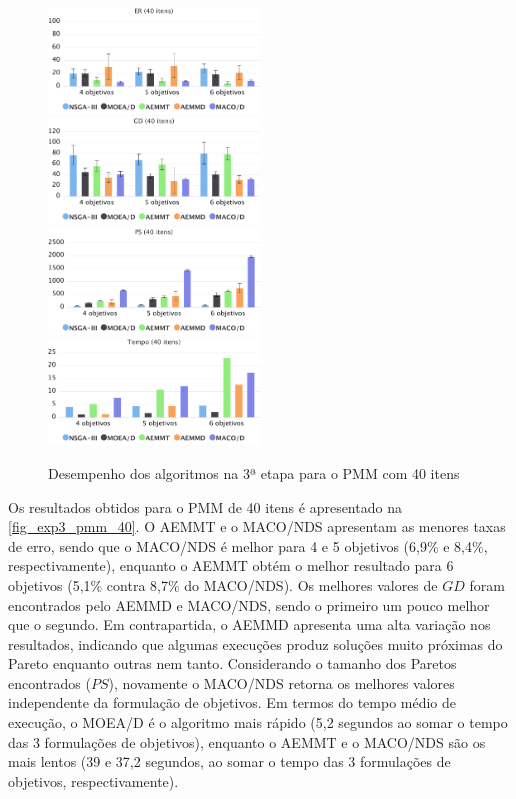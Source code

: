\begin{figure}[!htbp]	
	\includegraphics[width=0.5\textwidth]{cap_experimentos/figs/etapa3/er-mkp-40}
	\includegraphics[width=0.5\textwidth]{cap_experimentos/figs/etapa3/gd-mkp-40}
	\includegraphics[width=0.5\textwidth]{cap_experimentos/figs/etapa3/ps-mkp-40}
	\includegraphics[width=0.5\textwidth]{cap_experimentos/figs/etapa3/time-mkp-40}
	\caption{\label{fig_exp3_pmm_40}Desempenho dos algoritmos na 3ª etapa para o PMM com 40 itens}
\end{figure}

Os resultados obtidos para o PMM de 40 itens é apresentado na \autoref{fig_exp3_pmm_40}. O AEMMT e o MACO/NDS apresentam as menores taxas de erro, sendo que o MACO/NDS é melhor para 4 e 5 objetivos (6,9\% e 8,4\%, respectivamente), enquanto o AEMMT obtém o melhor resultado para 6 objetivos (5,1\% contra 8,7\% do MACO/NDS). Os melhores valores de $GD$ foram encontrados pelo AEMMD e MACO/NDS, sendo o primeiro um pouco melhor que o segundo. Em contrapartida, o AEMMD apresenta uma alta variação nos resultados, indicando que algumas execuções produz soluções muito próximas do Pareto enquanto outras nem tanto. Considerando o tamanho dos Paretos encontrados ($PS$), novamente o MACO/NDS retorna os melhores valores independente da formulação de objetivos. Em termos do tempo médio de execução, o MOEA/D é o algoritmo mais rápido (5,2 segundos ao somar o tempo das 3 formulações de objetivos), enquanto o AEMMT e o MACO/NDS são os mais lentos (39 e 37,2 segundos, ao somar o tempo das 3 formulações de objetivos, respectivamente).

